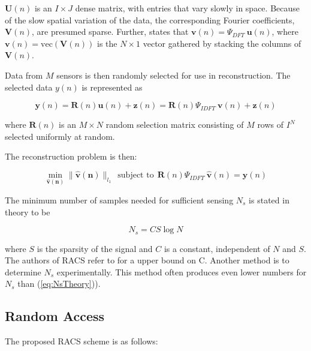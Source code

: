 \documentclass[Main]{subfiles}
\begin{document}
			$\mathbf{U}(n)$ is an $I \times J$ dense matrix, with entries that vary slowly in space.
			Because of the slow spatial variation of the data, the corresponding Fourier coefficients, $\mathbf{V}(n)$, are presumed sparse.
			Further, \cite{Fazel2011} states that $\mathbf{v}(n) = \Psi_{DFT}\ \mathbf{u}(n)$, where $\mathbf{v}(n) = \text{vec}(\mathbf{V}(n))$ is the $N \times 1$ vector gathered by stacking the columns of $\mathbf{V}(n)$.

			Data from $M$ sensors is then randomly selected for use in reconstruction.
			The selected data $y(n)$ is represented as

			\begin{equation}
				\mathbf{y}(n) = 
					\mathbf{R}(n) \mathbf{u}(n) + \mathbf{z}(n)
					= \mathbf{R}(n) \Psi_{IDFT}\ \mathbf{v}(n) + \mathbf{z}(n)
			\end{equation}

			where $\mathbf{R}(n)$ is an $M \times N$ random selection matrix consisting of $M$ rows of $I^N$ selected uniformly at random.

			The reconstruction problem is then:

			\begin{equation}
				\min_{\mathbf{\hat{v}(n)}} 
					\|\mathbf{\hat{v}(n)}\|_{l_1} 
					\ \ \text{subject to} \ \ 
					\mathbf{R}(n) \Psi_{IDFT}\ \mathbf{\hat{v}}(n) = \mathbf{y}(n)
			\end{equation}

			The minimum number of samples needed for sufficient sensing $N_s$ is stated in theory to be

			\begin{equation}
				N_s = CS \log{N}
				\label{eq:NsTheory} 
			\end{equation}

			where $S$ is the sparsity of the signal and $C$ is a constant, independent of $N$ and $S$.
			The authors of RACS refer to \cite{Candes2006} for a upper bound on C.
			Another method is to determine $N_s$ experimentally.
			This method often produces even lower numbers for $N_s$ than (\ref{eq:NsTheory})).
		


		\subsection{Random Access} %
		\label{sub:random_access}

			The proposed RACS scheme is as follows:
\end{document}
